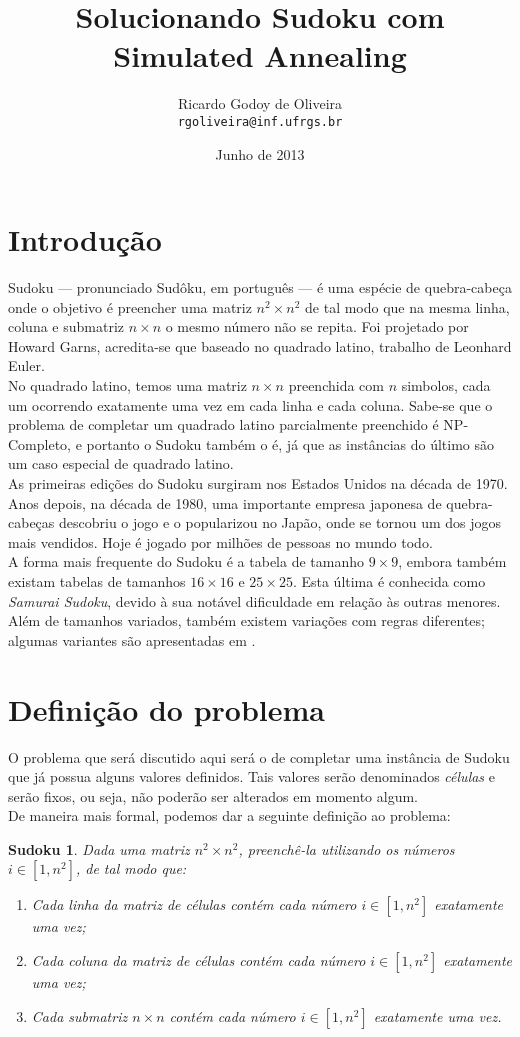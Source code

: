 \documentclass[10pt,a4paper,titlepage]{article}
\title{Solucionando Sudoku com Simulated Annealing}
\author{Ricardo Godoy de Oliveira \\ \texttt{rgoliveira@inf.ufrgs.br}}
\date{Junho de 2013}
\newtheorem*{sudoku}{Sudoku}
\begin{document}
\maketitle
\tableofcontents

\clearpage

\section{Introdução}
	Sudoku --- pronunciado Sudôku, em português --- é uma espécie de quebra-cabeça onde o objetivo é preencher uma matriz $n^2 \times n^2$ de tal modo que na mesma linha, coluna e submatriz $n \times n$ o mesmo número não se repita. Foi projetado por Howard Garns, acredita-se que baseado no quadrado latino, trabalho de Leonhard Euler.
	\\
	No quadrado latino, temos uma matriz $n \times n$ preenchida com $n$ simbolos, cada um ocorrendo exatamente uma vez em cada linha e cada coluna. Sabe-se que o problema de completar um quadrado latino parcialmente preenchido é NP-Completo, e portanto o Sudoku também o é, já que as instâncias do último são um caso especial de quadrado latino.
	\\
	As primeiras edições do Sudoku surgiram nos Estados Unidos na década de 1970. Anos depois, na década de 1980, uma importante empresa japonesa de quebra-cabeças descobriu o jogo e o popularizou no Japão, onde se tornou um dos jogos mais vendidos. Hoje é jogado por milhões de pessoas no mundo todo.
	\\
	A forma mais frequente do Sudoku é a tabela de tamanho $9 \times 9$, embora também existam tabelas de tamanhos $16 \times 16$ e $25 \times 25$. Esta última é conhecida como \emph{Samurai Sudoku}, devido à sua notável dificuldade em relação às outras menores. Além de tamanhos variados, também existem variações com regras diferentes; algumas variantes são apresentadas em \cite{variations}.

\section{Definição do problema}
	O problema que será discutido aqui será o de completar uma instância de Sudoku que já possua alguns valores definidos. Tais valores serão denominados \emph{células} e serão fixos, ou seja, não poderão ser alterados em momento algum.
	\\
	De maneira mais formal, podemos dar a seguinte definição ao problema:
	\begin{sudoku}
		Dada uma matriz $n^2 \times n^2$, preenchê-la utilizando os números $i \in [1,n^2]$, de tal modo que:
		\begin{enumerate}
		  \item Cada linha da matriz de células contém cada número $i \in [1,n^2]$ exatamente uma vez; \label{sdk:r1}
		  \item Cada coluna da matriz de células contém cada número $i \in [1,n^2]$ exatamente uma vez; \label{sdk:r2}
		  \item Cada submatriz $n \times n$ contém cada número $i \in [1,n^2]$ exatamente uma vez. \label{sdk:r3}
		\end{enumerate}
	\end{sudoku}
\end{document}
